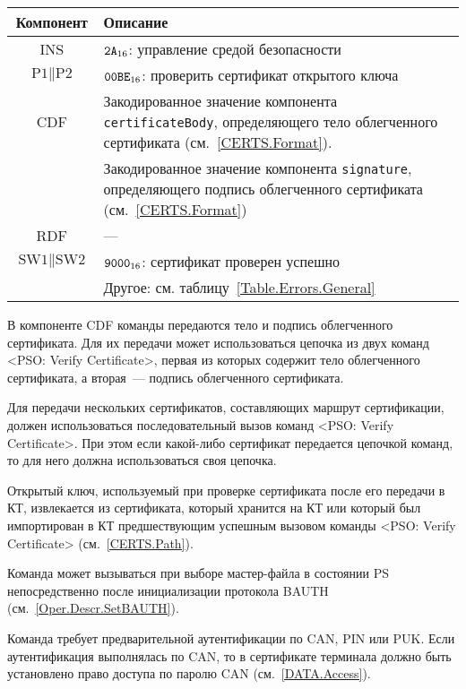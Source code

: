 \begin{table}[hbt]
\caption{}\label{Table.Oper.VerifyCertCmd}
\begin{tabular}{|c|p{14cm}|}
\hline
Компонент & Описание\\ 
\hline
\hline
INS & $\texttt{2A}_{16}$: управление средой безопасности \\
\hline
$\text{P1} \parallel \text{P2}$ & $\texttt{00BE}_{16}$: проверить 
сертификат открытого ключа \\ 
\hline
CDF  & Закодированное значение компонента \verb|certificateBody|, определяющего тело 
облегченного сертификата (см.~\ref{CERTS.Format}).\\
 & Закодированное значение компонента \verb|signature|, определяющего подпись 
облегченного сертификата (см.~\ref{CERTS.Format})\\
\hline 
\hline
RDF &  --- \\
\hline
$\text{SW1} \parallel \text{SW2}$ & $\texttt{9000}_{16}$: сертификат проверен успешно \\
\cline{2-2}
 & Другое: см. таблицу~\ref{Table.Errors.General} \\
\hline
\end{tabular}
\end{table}

В компоненте CDF команды передаются тело и подпись облегченного сертификата.
Для их передачи может использоваться цепочка из двух команд 
<PSO: Verify Certificate>, первая из которых содержит тело 
облегченного сертификата, а вторая~--- подпись облегченного сертификата.

Для передачи нескольких сертификатов, составляющих маршрут 
сертификации, должен использоваться последовательный 
вызов команд <PSO: Verify Certificate>. 
При этом если какой-либо сертификат передается цепочкой команд, 
то для него должна использоваться своя цепочка.

Открытый ключ, используемый при проверке сертификата после его передачи в
КТ, извлекается из сертификата, который хранится на КТ или который был 
импортирован в КТ предшествующим успешным вызовом 
команды <PSO: Verify Certificate> (см.~\ref{CERTS.Path}).

Команда может вызываться при выборе мастер-файла
в состоянии PS непосредственно после 
инициализации протокола BAUTH (см.~\ref{Oper.Descr.SetBAUTH}).

Команда требует предварительной аутентификации по CAN, PIN или PUK. 
Если аутентификация выполнялась по CAN,
то в сертификате терминала должно быть установлено 
право доступа по паролю CAN (см.~\ref{DATA.Access}).

